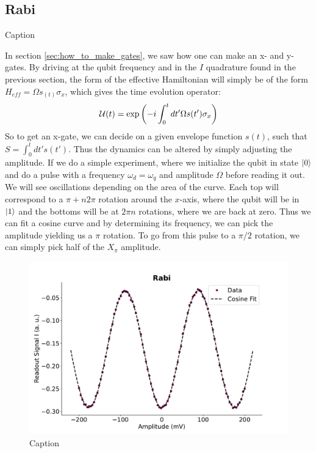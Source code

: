 \subsection{Rabi}
\begin{marginfigure}
    \centering
    \caption{Caption}
    \label{fig:enter-label}
\end{marginfigure}
In section \ref{sec:how_to_make_gates}, we saw how one can make an x- and y-gates. By driving at the qubit frequency and in the $I$ quadrature found in the previous section, the form of the effective Hamiltonian will simply be of the form $H_{eff} = \Omega s_(t) \sigma_x$, which gives the time evolution operator:
\begin{equation}
    \mathcal{U}(t) = \exp\left(-i\int_0^t dt' \Omega s(t') \sigma_x \right)
\end{equation}
So to get an x-gate, we can decide on a given envelope function $s(t)$, such that $S = \int_0^t  dt' s(t')$. Thus the dynamics can be altered by simply adjusting the amplitude. If we do a simple experiment, where we initialize the qubit in state $\ket{0}$ and do a pulse with a frequency $\omega_d = \omega_q$ and amplitude $\Omega$ before reading it out. We will see oscillations depending on the area of the curve. Each top will correspond to a $\pi +n2\pi$ rotation around the $x$-axis, where the qubit will be in $\ket{1}$ and the bottoms will be at $2\pi n$ rotations, where we are back at zero. Thus we can fit a cosine curve and by determining its frequency, we can pick the amplitude yielding us a $\pi$ rotation. To go from this pulse to a $\pi/2$ rotation, we can simply pick half of the $X_{\pi}$ amplitude.

\begin{figure}
    \centering
    \includegraphics{Calibrations/Figures/Rabi.pdf}
    \caption{Caption}
    \label{fig:enter-label}
\end{figure}


